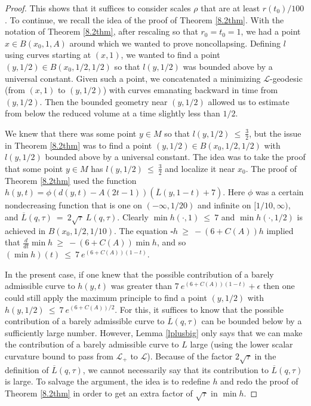 \documentclass[12pt]{amsart}
\numberwithin{equation}{section}
\theoremstyle{plain}
\theoremstyle{definition}
\theoremstyle{remark}
\begin{document}
\begin{proof}
This shows that it suffices to consider scales $\rho$ that are at
least $r(t_0)/100$. 
To continue,
we recall the idea of the proof of Theorem \ref{8.2thm}. 
With the notation of Theorem \ref{8.2thm},
after rescaling so that $r_0 = t_0 = 1$,
we had a point $x \in B(x_0, 1, A)$
around which we wanted to prove noncollapsing.  Defining $l$ using curves
starting at $(x, 1)$, we wanted to find a point
$(y, 1/2) \in
B(x_0, 1/2, 1/2)$ so that
$l(y, 1/2)$ was bounded above by a universal constant.  Given such a point,
we concatenated a minimizing ${\mathcal L}$-geodesic (from $(x, 1)$
to $(y, 1/2)$)
with curves emanating backward in time from
$(y, 1/2)$. Then the bounded geometry near $(y, 1/2)$
allowed us 
to estimate from below the reduced volume at a time slightly less than
$1/2$. 

We knew that there was some point $y \in M$ so that
$l(y, 1/2) \: \le \: \frac{3}{2}$, but the issue in 
Theorem \ref{8.2thm} was to find 
a point $(y, 1/2) \in
B(x_0, 1/2, 1/2)$ with $l(y, 1/2)$ bounded above
by a universal constant. The idea was to take the proof that 
some point $y \in M$ has
$l(y, 1/2) \: \le \: \frac{3}{2}$ and localize it near $x_0$.
The proof of Theorem \ref{8.2thm} used the function
$h(y, t) = \phi(d(y, t) - A (2t-1)) (\overline{L}(y, 1-t) + 7)$.
Here $\phi$ was a certain nondecreasing function that is one on $(- \infty, 
1/20)$ and infinite on $[1/10, \infty)$, and
$\overline{L}(q, \tau) \: = \: 2 \sqrt{\tau} \: L(q, \tau)$.
Clearly $\min h(\cdot, 1) \: \le \: 7$ and $\min h(\cdot, 1/2)$ is
achieved in $B(x_0, 1/2, 1/10)$. The equation
$\square h \: \ge \: - (6+ C(A)) h$ implied that
$\frac{d}{dt} \min h \: \ge \: -(6 + C(A)) \min h$, and so
$(\min h)(t) \: \le \:
7 \: e^{(6+C(A))(1-t)}$. 

In the present case,
if one knew that the possible contribution of a barely admissible curve to
$h(y, t)$ was greater than $7 \: e^{(6+C(A))(1-t)} + \epsilon$
then one could still apply the maximum principle to find a point $(y, 1/2)$
with $h(y, 1/2) \: \le \: 7 \: e^{(6+C(A))/2}$.
For this, it
suffices to know that the possible contribution of a barely admissible curve
to $\overline{L}(q, \tau)$ can be bounded below by a sufficiently large
number.  However, Lemma \ref{lplusbig}  only says that we can make the
contribution of a barely admissible curve to $L$ large
(using the lower scalar curvature bound to pass from
${\mathcal L}_+$ to ${\mathcal L}$).
Because of the factor $2 \sqrt{\tau}$ in the definition of
$\overline{L}(q, \tau)$, we cannot necessarily say that its contribution
to $\overline{L}(q, \tau)$ is large. To salvage the argument,
the idea is to redefine $h$ and
redo the proof of Theorem \ref{8.2thm} in order to get an extra factor
of $\sqrt{\tau}$ in $\min h$. 


\end{proof}
\end{document}
